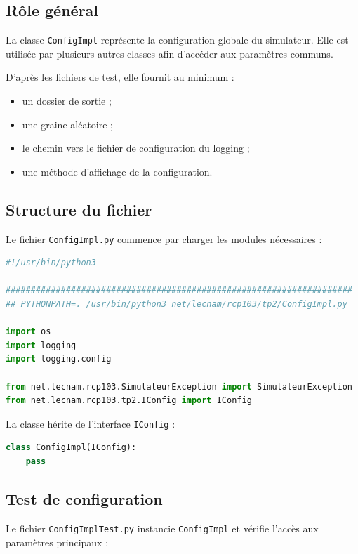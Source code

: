 \documentclass{article}
\begin{document}
\subsection{Rôle général}

La classe \texttt{ConfigImpl} représente la configuration globale du simulateur. Elle est utilisée par plusieurs autres classes afin d’accéder aux paramètres communs.

D’après les fichiers de test, elle fournit au minimum :
\begin{itemize}[leftmargin=*]
    \item un dossier de sortie ;
    \item une graine aléatoire ;
    \item le chemin vers le fichier de configuration du logging ;
    \item une méthode d’affichage de la configuration.
\end{itemize}

\subsection{Structure du fichier}

Le fichier \texttt{ConfigImpl.py} commence par charger les modules nécessaires :

\begin{lstlisting}[language=Python, caption=Extrait de ConfigImpl.py]
#!/usr/bin/python3

#####################################################################
## PYTHONPATH=. /usr/bin/python3 net/lecnam/rcp103/tp2/ConfigImpl.py

import os
import logging
import logging.config

from net.lecnam.rcp103.SimulateurException import SimulateurException
from net.lecnam.rcp103.tp2.IConfig import IConfig
\end{lstlisting}

La classe hérite de l’interface \texttt{IConfig} :

\begin{lstlisting}[language=Python, caption=Déclaration de ConfigImpl]
class ConfigImpl(IConfig):
    pass
\end{lstlisting}

\subsection{Test de configuration}

Le fichier \texttt{ConfigImplTest.py} instancie \texttt{ConfigImpl} et vérifie l’accès aux paramètres principaux :
\end{document}
